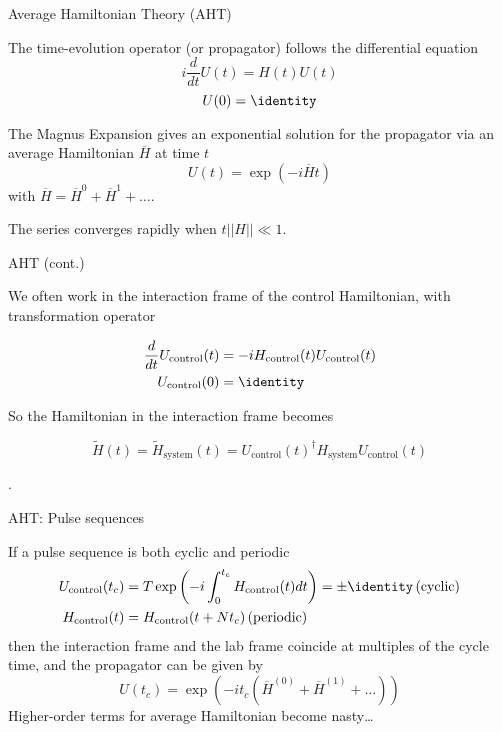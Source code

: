 \documentclass{beamer}
\begin{document}
\begin{frame}{Average Hamiltonian Theory (AHT)}

The time-evolution operator (or propagator) follows the differential
equation \[
i \frac{d}{dt} U(t) = H(t)U(t)
\] \[
U(0) = \identity
\]

The Magnus Expansion gives an exponential solution for the propagator
via an average Hamiltonian \(\overline{H}\) at time \(t\) \[
U(t) = \exp\left( -i \overline{H} t \right)
\] with \(\overline{H} = \overline{H}^0 + \overline{H}^1 + \dots\).

The series converges rapidly when \(t||H|| \ll 1\).

\end{frame}

\begin{frame}{AHT (cont.)}

We often work in the interaction frame of the control Hamiltonian, with transformation operator

\begin{align*}
    \frac{d}{dt} U_\text{control}(t) &=
        -i H_\text{control}(t)U_\text{control}(t) \\
    U_\text{control}(0) &= \identity
\end{align*}

So the Hamiltonian in the interaction frame becomes

\[
    \widetilde{H}(t) = \widetilde{H}_\text{system}(t) = U_\text{control}(t)^\dagger H_\text{system} U_\text{control}(t)
\]

\cite{brinkmann_2016}.
\end{frame}

\begin{frame}{AHT: Pulse sequences}


If a pulse sequence is both cyclic and periodic \cite{gerstein-dybowski}
\begin{align*}
    U_\text{control}(t_c) &= T\exp \left(
        -i \int_0^{t_c} H_\text{control}(t) dt \right) = \pm \identity
         \, \text{(cyclic)} \\
    H_\text{control}(t) &= H_\text{control}(t + Nt_c) \, \text{(periodic)}
\end{align*}
then the interaction frame and the lab frame coincide at multiples of
the cycle time, and the propagator can be given by
\[
    U(t_c) = \exp\left( -i t_c (\overline{H}^{(0)} +
        \overline{H}^{(1)} + \dots) \right)
\]
Higher-order terms for average Hamiltonian become nasty\dots

\end{frame}
\end{document}

